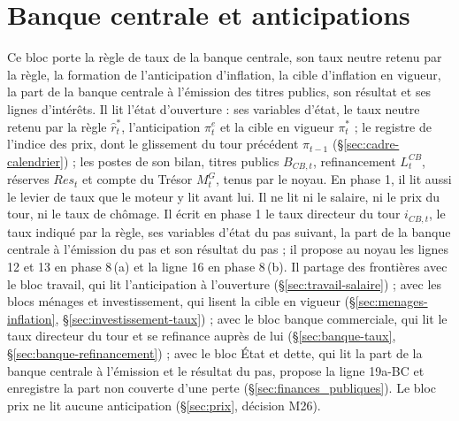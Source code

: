 \documentclass[11pt,a4paper]{article}
\begin{document}
\section{Banque centrale et anticipations}
\label{sec:banque_centrale}
Ce bloc porte la règle de taux de la banque centrale, son taux neutre retenu par la règle, la formation de l'anticipation d'inflation, la cible d'inflation en vigueur, la part de la banque centrale à l'émission des titres publics, son résultat et ses lignes d'intérêts. Il lit l'état d'ouverture : ses variables d'état, le taux neutre retenu par la règle $\hat r^\ast_t$, l'anticipation $\pi^e_t$ et la cible en vigueur $\pi^\ast_t$ ; le registre de l'indice des prix, dont le glissement du tour précédent $\pi_{t-1}$ (\S\ref{sec:cadre-calendrier}) ; les postes de son bilan, titres publics $B_{\mathit{CB},t}$, refinancement $L^{\mathit{CB}}_t$, réserves $\mathit{Res}_t$ et compte du Trésor $M^G_t$, tenus par le noyau. En phase 1, il lit aussi le levier de taux que le moteur y lit avant lui. Il ne lit ni le salaire, ni le prix du tour, ni le taux de chômage. Il écrit en phase 1 le taux directeur du tour $i_{\mathit{CB},t}$, le taux indiqué par la règle, ses variables d'état du pas suivant, la part de la banque centrale à l'émission du pas et son résultat du pas ; il propose au noyau les lignes 12 et 13 en phase 8\,(a) et la ligne 16 en phase 8\,(b). Il partage des frontières avec le bloc travail, qui lit l'anticipation à l'ouverture (\S\ref{sec:travail-salaire}) ; avec les blocs ménages et investissement, qui lisent la cible en vigueur (\S\ref{sec:menages-inflation}, \S\ref{sec:investissement-taux}) ; avec le bloc banque commerciale, qui lit le taux directeur du tour et se refinance auprès de lui (\S\ref{sec:banque-taux}, \S\ref{sec:banque-refinancement}) ; avec le bloc État et dette, qui lit la part de la banque centrale à l'émission et le résultat du pas, propose la ligne 19a-BC et enregistre la part non couverte d'une perte (\S\ref{sec:finances_publiques}). Le bloc prix ne lit aucune anticipation (\S\ref{sec:prix}, décision M26).
\end{document}
